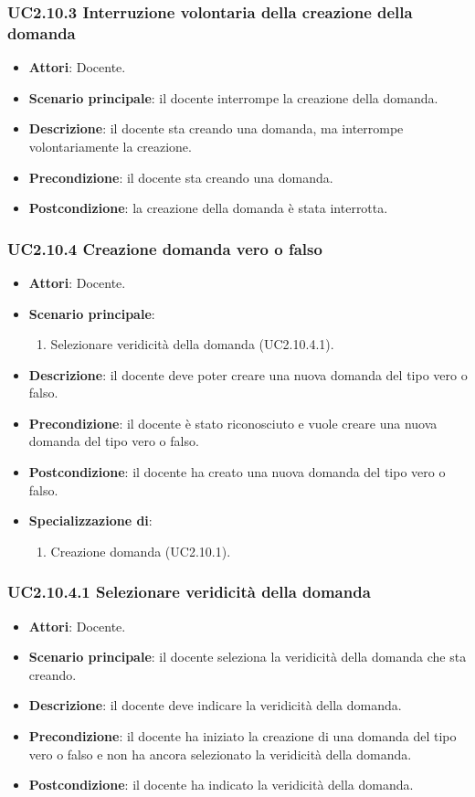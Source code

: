 \subsubsection{UC2.10.3 Interruzione volontaria della creazione della domanda}
\begin{itemize}
\item \textbf{Attori}: Docente.
\item \textbf{Scenario principale}: il docente interrompe la creazione della domanda.
\item \textbf{Descrizione}: il docente sta creando una domanda, ma interrompe volontariamente la creazione.
\item \textbf{Precondizione}: il docente sta creando una domanda.
\item \textbf{Postcondizione}: la creazione della domanda è stata interrotta.
\end{itemize}
\subsubsection{UC2.10.4 Creazione domanda vero o falso}
\begin{itemize}
\item \textbf{Attori}: Docente.
\item \textbf{Scenario principale}:
\begin{enumerate}
\item Selezionare veridicità della domanda (UC2.10.4.1).
\end{enumerate}
\item \textbf{Descrizione}: il docente deve poter creare una nuova domanda del tipo vero o falso.
\item \textbf{Precondizione}: il docente è stato riconosciuto e vuole creare una nuova domanda del tipo vero o falso.
\item \textbf{Postcondizione}: il docente ha creato una nuova domanda del tipo vero o falso.
\item \textbf{Specializzazione di}:
\begin{enumerate}
\item Creazione domanda (UC2.10.1).
\end{enumerate}
\end{itemize}
\subsubsection{UC2.10.4.1 Selezionare veridicità della domanda}
\begin{itemize}
\item \textbf{Attori}: Docente.
\item \textbf{Scenario principale}: il docente seleziona la veridicità della domanda che sta creando.
\item \textbf{Descrizione}: il docente deve indicare la veridicità della domanda.
\item \textbf{Precondizione}: il docente ha iniziato la creazione di una domanda del tipo vero o falso e non ha ancora selezionato la veridicità della domanda.
\item \textbf{Postcondizione}: il docente ha indicato la veridicità della domanda.
\end{itemize}
